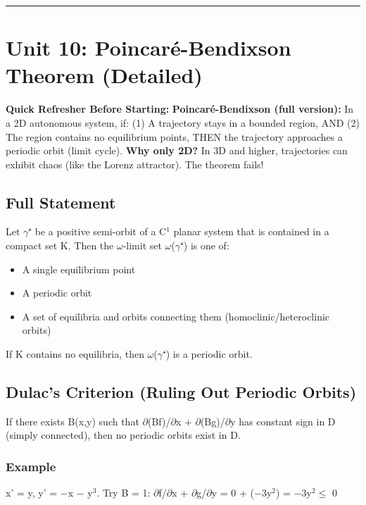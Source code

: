 \documentclass[12pt,a4paper,openany]{book}
\begin{document}
{{\bigskip\noindent\rule{\textwidth}{0.4pt}\bigskip

\section{Unit 10: Poincaré-Bendixson Theorem (Detailed)}

\begin{prereqbox}
 \textbf{Quick Refresher Before Starting:}
\textbf{Poincaré-Bendixson (full version):} In a 2D autonomous system, if:
(1) A trajectory stays in a bounded region, AND
(2) The region contains no equilibrium points,
THEN the trajectory approaches a periodic orbit (limit cycle).
\textbf{Why only 2D?} In 3D and higher, trajectories can exhibit chaos (like the Lorenz attractor). The theorem fails!
\end{prereqbox}


\subsection{Full Statement}

Let $\gamma$⁺ be a positive semi-orbit of a C$^1$ planar system that is contained in a compact set K. Then the $\omega$-limit set $\omega$($\gamma$⁺) is one of:

\begin{itemize}
  \item A single equilibrium point
  \item A periodic orbit
  \item A set of equilibria and orbits connecting them (homoclinic/heteroclinic orbits)
\end{itemize}

If K contains no equilibria, then $\omega$($\gamma$⁺) is a periodic orbit.

\subsection{Dulac's Criterion (Ruling Out Periodic Orbits)}

If there exists B(x,y) such that $\partial$(Bf)/$\partial$x + $\partial$(Bg)/$\partial$y has constant sign in D (simply connected), then no periodic orbits exist in D.

\subsubsection{Example}
x' = y, y' = −x − y$^3$. Try B = 1:
$\partial$f/$\partial$x + $\partial$g/$\partial$y = 0 + (−3y$^2$) = −3y$^2\leq$ 0

}}
\end{document}
